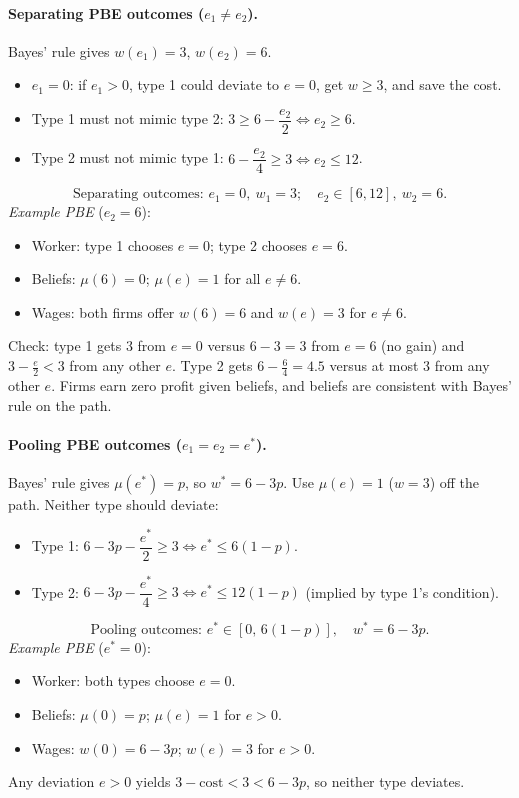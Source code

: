 \documentclass[11pt]{article}
\begin{document}
\paragraph{Separating PBE outcomes ($e_1\neq e_2$).} Bayes' rule gives $w(e_1)=3$, $w(e_2)=6$.
\begin{itemize}
  \item $e_1=0$: if $e_1>0$, type 1 could deviate to $e=0$, get $w\ge3$, and save the cost.
  \item Type 1 must not mimic type 2: $3\ge 6-\dfrac{e_2}{2}\iff e_2\ge 6$.
  \item Type 2 must not mimic type 1: $6-\dfrac{e_2}{4}\ge 3\iff e_2\le 12$.
\end{itemize}
\[
  \boxed{\text{Separating outcomes: } e_1=0,\ w_1=3;\quad e_2\in[6,12],\ w_2=6.}
\]
\emph{Example PBE} ($e_2=6$):
\begin{itemize}
  \item Worker: type 1 chooses $e=0$; type 2 chooses $e=6$.
  \item Beliefs: $\mu(6)=0$; $\mu(e)=1$ for all $e\neq6$.
  \item Wages: both firms offer $w(6)=6$ and $w(e)=3$ for $e\neq6$.
\end{itemize}
Check: type 1 gets $3$ from $e=0$ versus $6-3=3$ from $e=6$ (no gain) and $3-\tfrac e2<3$ from any other $e$. Type 2 gets $6-\tfrac64=4.5$ versus at most $3$ from any other $e$. Firms earn zero profit given beliefs, and beliefs are consistent with Bayes' rule on the path.

\paragraph{Pooling PBE outcomes ($e_1=e_2=e^*$).} Bayes' rule gives $\mu(e^*)=p$, so $w^*=6-3p$. Use $\mu(e)=1$ ($w=3$) off the path. Neither type should deviate:
\begin{itemize}
  \item Type 1: $6-3p-\dfrac{e^*}{2}\ge 3\iff e^*\le 6(1-p)$.
  \item Type 2: $6-3p-\dfrac{e^*}{4}\ge 3\iff e^*\le 12(1-p)$ (implied by type 1's condition).
\end{itemize}
\[
  \boxed{\text{Pooling outcomes: } e^*\in[0,\,6(1-p)],\quad w^*=6-3p.}
\]
\emph{Example PBE} ($e^*=0$):
\begin{itemize}
  \item Worker: both types choose $e=0$.
  \item Beliefs: $\mu(0)=p$; $\mu(e)=1$ for $e>0$.
  \item Wages: $w(0)=6-3p$; $w(e)=3$ for $e>0$.
\end{itemize}
Any deviation $e>0$ yields $3-\text{cost}<3<6-3p$, so neither type deviates.
\end{document}
